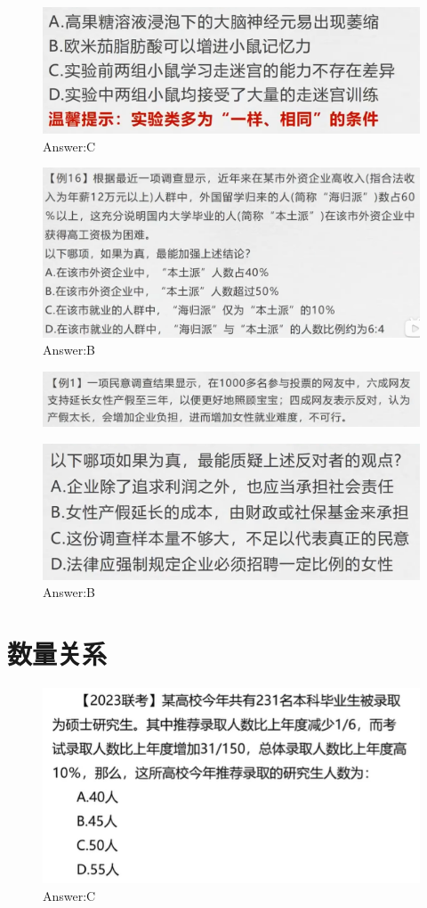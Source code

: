 \documentclass{article}
\numberwithin{equation}{section}						%
\numberwithin{figure}{section}							%
\begin{document}
\begin{sloppypar}
\begin{figure}[H]
     \centering
     \includegraphics[width=0.45\linewidth]{237.png}
		\caption{Answer:C}
\end{figure}


\begin{figure}[H]
     \centering
     \includegraphics[width=0.6\linewidth]{238.png}
		\caption{Answer:B}
\end{figure}


\begin{figure}[H]
     \centering
     \includegraphics[width=0.6\linewidth]{239.png}
\end{figure}


\begin{figure}[H]
     \centering
     \includegraphics[width=0.45\linewidth]{240.png}
		\caption{Answer:B}
\end{figure}


\section{数量关系}

\begin{figure}[H]
     \centering
     \includegraphics[width=0.6\linewidth]{241.png}
		\caption{Answer:C}
\end{figure}



\end{sloppypar}
\end{document}
